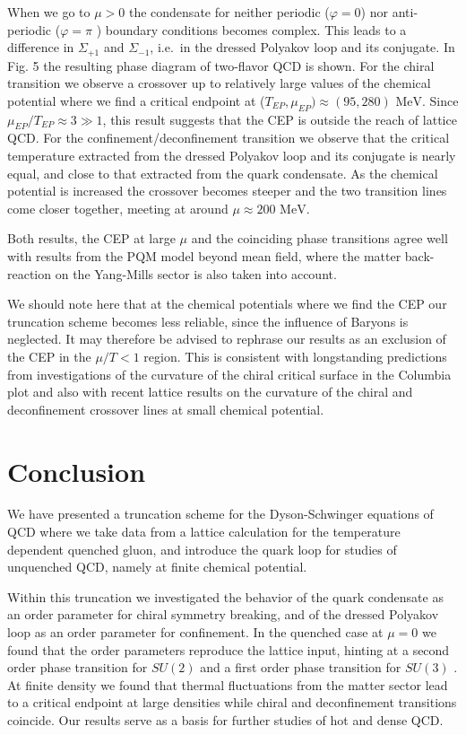 \documentclass[a4paper,fleqn]{cas-dc}
\begin{document}
When we go to $\mu > 0$ the condensate for neither periodic ($\varphi = 0$) nor anti-periodic ($\varphi = \pi$ ) boundary conditions
becomes complex. This leads to a difference in $\Sigma_{+1}$ and $\Sigma_{- 1}$, i.e.\ in the dressed Polyakov loop and its conjugate. In Fig. 5 the
resulting phase diagram of two-flavor QCD is shown. For the chiral transition we observe a crossover up to relatively large
values of the chemical potential where we find a critical endpoint at ($T_{ EP}, \mu_{EP}) \approx ( 95 , 280 ) \text{ MeV}$. Since $\mu_{EP} / T_{EP} \approx 3 \gg 1$,
this result suggests that the CEP is outside the reach of lattice QCD. For the confinement/deconfinement transition we
observe that the critical temperature extracted from the dressed Polyakov loop and its conjugate is nearly equal, and close
to that extracted from the quark condensate. As the chemical potential is increased the crossover becomes steeper and the
two transition lines come closer together, meeting at around $\mu \approx 200 \text{ MeV}$.

Both results, the CEP at large $\mu$ and the coinciding phase transitions agree well with results from the PQM model \cite{PhysRevC.83.054904}
beyond mean field, where the matter back-reaction on the Yang-Mills sector is also taken into account.

We should note here that at the chemical potentials where we find the CEP our truncation scheme becomes less reliable,
since the influence of Baryons is neglected. It may therefore be advised to rephrase our results as an exclusion of the CEP
in the $\mu/ T < 1$ region. This is consistent with longstanding predictions from investigations of the curvature of the chiral
critical surface in the Columbia plot \cite{DEFORCRAND2002290} and also with recent lattice results on the curvature of the chiral and deconfinement
crossover lines at small chemical potential.

\section{Conclusion}
We have presented a truncation scheme for the Dyson-Schwinger equations of QCD where we take data from a lattice
calculation for the temperature dependent quenched gluon, and introduce the quark loop for studies of unquenched QCD,
namely at finite chemical potential.

Within this truncation we investigated the behavior of the quark condensate as an order parameter for chiral symmetry
breaking, and of the dressed Polyakov loop as an order parameter for confinement. In the quenched case at $\mu = 0$ we
found that the order parameters reproduce the lattice input, hinting at a second order phase transition for $SU ( 2 )$ and a
first order phase transition for $SU ( 3 )$ . At finite density we found that thermal fluctuations from the matter sector lead to
a critical endpoint at large densities while chiral and deconfinement transitions coincide. Our results serve as a basis for
further studies of hot and dense QCD.
\end{document}
